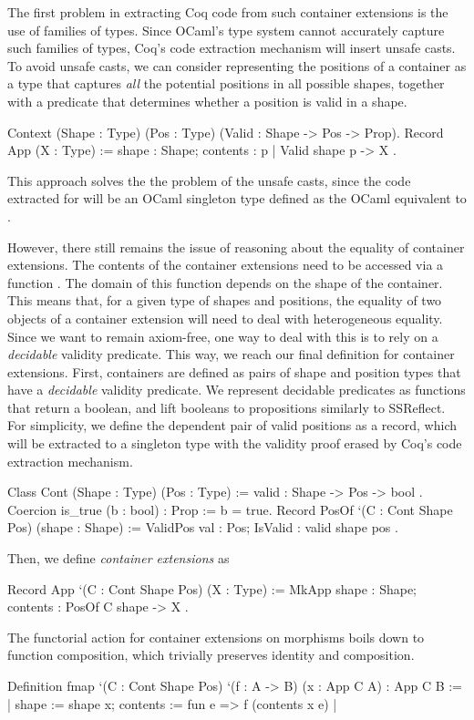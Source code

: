 \documentclass[anonymous, a4paper, UKenglish, cleveref, autoref, thm-restate]{lipics-v2021}
\begin{document}
The first problem in extracting Coq code from such container extensions is the
use of families of types. Since OCaml's type system cannot accurately capture
such families of types, Coq's code extraction mechanism will insert unsafe
casts. To avoid unsafe casts, we can consider representing the positions of a
container as a type that captures \emph{all} the potential positions in all
possible shapes, together with a predicate  that
determines whether a position is valid in a shape.
\begin{coqcode}
Context (Shape : Type) (Pos : Type) (Valid : Shape -> Pos -> Prop).
Record App (X : Type) := { shape    : Shape; 
                          contents : {p | Valid shape p} -> X }.
\end{coqcode}
This approach solves the the problem of the unsafe casts, since the code
extracted for  will be an OCaml singleton
type defined as the OCaml equivalent to .

However, there still remains the issue of reasoning about the equality of
container extensions. The contents of the container extensions need to be
accessed via a function . The domain of this function
depends on the shape of the container. This means that, for a given type of
shapes and positions, the equality of two objects of a container extension will
need to deal with heterogeneous equality. Since we want to remain axiom-free,
one way to deal with this is to rely on a \emph{decidable} validity predicate.
This way, we reach our final definition for container extensions. First,
containers are defined as pairs of shape and position types that have a
\emph{decidable} validity predicate. We represent decidable predicates as
functions that return a boolean, and lift booleans to propositions similarly to
SSReflect. For simplicity, we define the dependent pair of valid positions as a
record, which will be extracted to a singleton type with the validity proof
erased by Coq's code extraction mechanism.
\begin{coqcode}
Class Cont (Shape : Type) (Pos : Type) := { valid : Shape -> Pos -> bool }.
Coercion is_true (b : bool) : Prop := b = true.
Record PosOf `(C : Cont Shape Pos) (shape : Shape) := 
  ValidPos { val : Pos; IsValid : valid shape pos }.
\end{coqcode}
Then, we define \emph{container extensions} as
\begin{coqcode}
Record App `(C : Cont Shape Pos) (X : Type) :=
  MkApp { shape : Shape; contents : PosOf C shape -> X }.
\end{coqcode}
The functorial action for container extensions on morphisms boils down to
function composition, which trivially preserves identity and composition.
\begin{coqcode}
Definition fmap `(C : Cont Shape Pos) `(f : A -> B) (x : App C A) : App C B
  := {| shape := shape x; contents := fun e => f (contents x e) |}
\end{coqcode}
\end{document}
